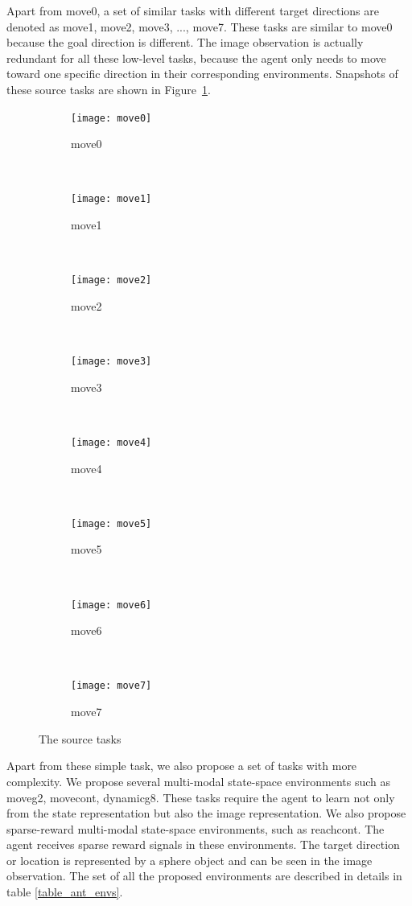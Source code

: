 Apart from move0, a set of similar tasks with different target directions are denoted as move1, move2, move3, ..., move7. These tasks are similar to move0 because the goal direction is different. The image observation is actually redundant for all these low-level tasks, because the agent only needs to move toward one specific direction in their corresponding environments. Snapshots of these source tasks are shown in Figure~\ref{fig:task8}.
\begin{figure}[!htbp]
	\centering
	\begin{subfigure}[t]{0.3\textwidth}
		\centering
		\texttt{[image: move0]}
		\caption{move0}
	\end{subfigure}%
	~ 
	\begin{subfigure}[t]{0.3\textwidth}
		\centering
		\texttt{[image: move1]}
		\caption{move1}
	\end{subfigure}
	~ 
	\begin{subfigure}[t]{0.3\textwidth}
		\centering
		\texttt{[image: move2]}
		\caption{move2}
	\end{subfigure}
	~ 
	\begin{subfigure}[t]{0.3\textwidth}
		\centering
		\texttt{[image: move3]}
		\caption{move3}
	\end{subfigure}
	~ 
	\begin{subfigure}[t]{0.3\textwidth}
		\centering
		\texttt{[image: move4]}
		\caption{move4}
	\end{subfigure}
	~ 
	\begin{subfigure}[t]{0.3\textwidth}
		\centering
		\texttt{[image: move5]}
		\caption{move5}
	\end{subfigure}
	~ 
	\begin{subfigure}[t]{0.3\textwidth}
		\centering
		\texttt{[image: move6]}
		\caption{move6}
	\end{subfigure}
	~ 
	\begin{subfigure}[t]{0.3\textwidth}
		\centering
		\texttt{[image: move7]}
		\caption{move7}
	\end{subfigure}

	\caption{The source tasks}
	\label{fig:task8}
\end{figure}

Apart from these simple task, we also propose a set of tasks with more complexity. We propose several multi-modal state-space environments such as moveg2, movecont, dynamicg8. These tasks require the agent to learn not only from the state representation but also the image representation. We also propose sparse-reward multi-modal state-space environments, such as reachcont. The agent receives sparse reward signals in these environments. The target direction or location is represented by a sphere object and can be seen in the image observation.
The set of all the proposed environments are described in details in table \ref{table_ant_envs}.


